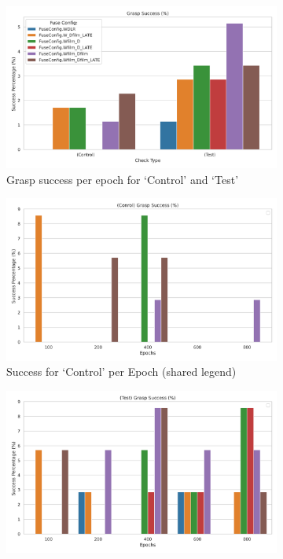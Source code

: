 \begin{figure}[H]
  \centering
  \begin{subfigure}{0.30\linewidth}
    \centering
    \includegraphics[width=\linewidth]{assets/evaluation/film/film-grasp-success-smaller.png}
    \caption{Grasp success per epoch for `Control' and `Test'}\label{subfig:film-grasp-success}
  \end{subfigure}
  \hfill
  \begin{subfigure}{0.30\linewidth}
    \centering
    \includegraphics[width=\linewidth]{assets/evaluation/film/film-grasp-control-success-epochs-smaller.png}
    \caption{Success for `Control' per Epoch (shared legend)}\label{subfig:film-grasp-control-success-epoochs}
  \end{subfigure}
  \hfill
  \begin{subfigure}{0.30\linewidth}
    \centering
    \includegraphics[width=\linewidth]{assets/evaluation/film/film-grasp-test-success-epochs-smaller.png}

\end{subfigure}
\end{figure}
